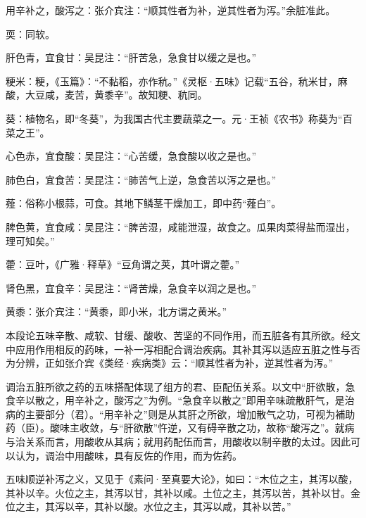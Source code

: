 \documentclass[draft,12pt]{ctexbook}
\begin{document}

\begin{jiaozhu}
  \item 用辛补之，酸泻之：张介宾注：“顺其性者为补，逆其性者为泻。”余脏准此。
  \item 耎：同软。
  \item 肝色青，宜食甘：吴昆注：“肝苦急，急食甘以缓之是也。”
  \item 粳米：粳，《玉篇》：“不黏稻，亦作秔。”《灵枢·五味》记载“五谷，秔米甘，麻酸，大豆咸，麦苦，黄黍辛”。故知粳、秔同。
  \item 葵：植物名，即“冬葵”，为我国古代主要蔬菜之一。元·王祯《农书》称葵为“百菜之王”。
  \item 心色赤，宜食酸：吴昆注：“心苦缓，急食酸以收之是也。”
  \item 肺色白，宜食苦：吴昆注：“肺苦气上逆，急食苦以泻之是也。”
  \item 薤：俗称小根蒜，可食。其地下鳞茎干燥加工，即中药“薤白”。
  \item 脾色黄，宜食咸：吴昆注：“脾苦湿，咸能泄湿，故食之。瓜果肉菜得盐而湿出，理可知矣。”
  \item 藿：豆叶，《广雅·释草》“豆角谓之荚，其叶谓之藿。”
  \item 肾色黑，宜食辛：吴昆注：“肾苦燥，急食辛以润之是也。”
  \item 黄黍：张介宾注：“黄黍，即小米，北方谓之黄米。”
\end{jiaozhu}



本段论五味辛散、咸软、甘缓、酸收、苦坚的不同作用，而五脏各有其所欲。经文中应用作用相反的药味，一补一泻相配合调治疾病。其补其泻以适应五脏之性与否为分辨，正如张介宾《类经·疾病类》云：“顺其性者为补，逆其性者为泻。”

调治五脏所欲之药的五味搭配体现了组方的君、臣配伍关系。以文中“肝欲散，急食辛以散之，用辛补之，酸泻之”为例。“急食辛以散之”即用辛味疏散肝气，是治病的主要部分（君）。“用辛补之”则是从其肝之所欲，增加散气之功，可视为補助药（臣）。酸味主收敛，与“肝欲散”忤逆，又有碍辛散之功，故称“酸泻之”。就病与治关系而言，用酸收从其病；就用药配伍而言，用酸收以制辛散的太过。因此可以认为，调治中用酸味，具有反佐的作用，而为佐药。

五味顺逆补泻之义，又见于《素问·至真要大论》，如曰：“木位之主，其泻以酸，其补以辛。火位之主，其泻以甘，其补以咸。土位之主，其泻以苦，其补以甘。金位之主，其泻以辛，其补以酸。水位之主，其泻以咸，其补以苦。”

\end{document}
